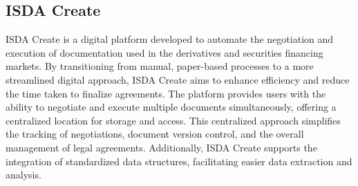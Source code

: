\subsection{ISDA Create}
\label{subsec:isda_create}
ISDA Create \citep{isda_create_factsheet} is a digital platform developed to automate the negotiation and execution of documentation used in the derivatives and securities financing markets. By transitioning from manual, paper-based processes to a more streamlined digital approach, ISDA Create aims to enhance efficiency and reduce the time taken to finalize agreements. The platform provides users with the ability to negotiate and execute multiple documents simultaneously, offering a centralized location for storage and access. This centralized approach simplifies the tracking of negotiations, document version control, and the overall management of legal agreements. Additionally, ISDA Create supports the integration of standardized data structures, facilitating easier data extraction and analysis. 
